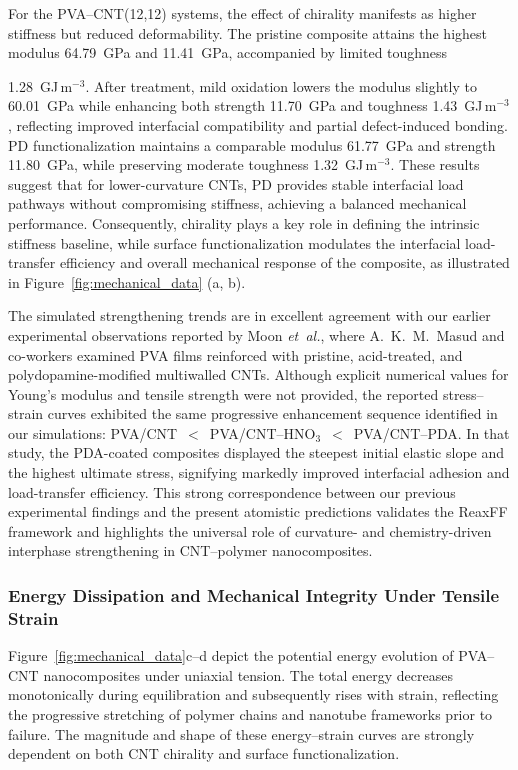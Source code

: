 \documentclass[journal=jacsat,manuscript=article]{achemso}
\begin{document}
For the PVA--CNT(12,12) systems, the effect of chirality manifests as higher stiffness but reduced deformability. The pristine composite attains the highest modulus 64.79~GPa and 11.41~GPa, accompanied by limited toughness {1.28~GJ\,m$^{-3}$. After  treatment, mild oxidation lowers the modulus slightly to 60.01~GPa while enhancing both strength 11.70~GPa and toughness 1.43~GJ\,m$^{-3}$, reflecting improved interfacial compatibility and partial defect-induced bonding. PD functionalization maintains a comparable modulus 61.77~GPa and strength 11.80~GPa, while preserving moderate toughness 1.32~GJ\,m$^{-3}$. These results suggest that for lower-curvature CNTs, PD provides stable interfacial load pathways without compromising stiffness, achieving a balanced mechanical performance. Consequently, chirality plays a key role in defining the intrinsic stiffness baseline, while surface functionalization modulates the interfacial load-transfer efficiency and overall mechanical response of the composite, as illustrated in Figure~\ref{fig:mechanical_data} (a, b).

\medskip

The simulated strengthening trends are in excellent agreement with our earlier experimental observations reported by Moon \textit{et~al.}\cite{moon2025synthesis}, where A.~K.~M.~Masud and co-workers examined PVA films reinforced with pristine, acid-treated, and polydopamine-modified multiwalled CNTs. Although explicit numerical values for Young’s modulus and tensile strength were not provided, the reported stress--strain curves exhibited the same progressive enhancement sequence identified in our simulations: PVA/CNT~$<$~PVA/CNT--HNO$_3$~$<$~PVA/CNT--PDA. In that study, the PDA-coated composites displayed the steepest initial elastic slope and the highest ultimate stress, signifying markedly improved interfacial adhesion and load-transfer efficiency. This strong correspondence between our previous experimental findings and the present atomistic predictions validates the ReaxFF framework and highlights the universal role of curvature- and chemistry-driven interphase strengthening in CNT--polymer nanocomposites.



\subsubsection{Energy Dissipation and Mechanical Integrity Under Tensile Strain}

Figure~\ref{fig:mechanical_data}c--d depict the potential energy evolution of PVA--CNT nanocomposites under uniaxial tension. The total energy decreases monotonically during equilibration and subsequently rises with strain, reflecting the progressive stretching of polymer chains and nanotube frameworks prior to failure. The magnitude and shape of these energy--strain curves are strongly dependent on both CNT chirality and surface functionalization.

}
\end{document}
